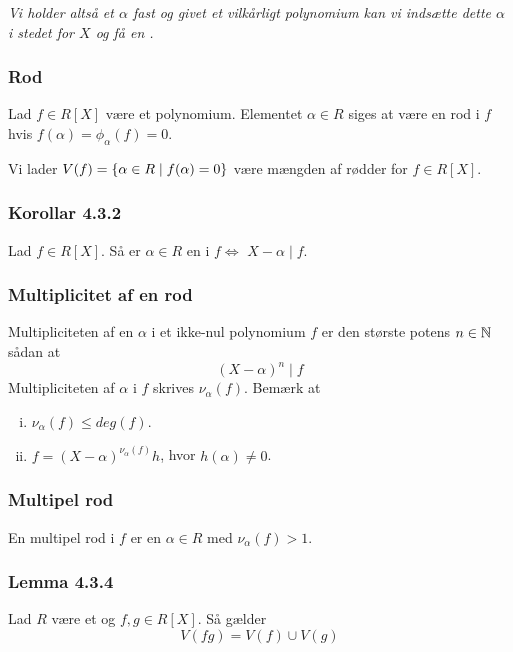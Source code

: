 \textit{Vi holder altså et $\alpha$ fast og givet et vilkårligt polynomium kan
vi indsætte dette $\alpha$ i stedet for $X$ og få en .}

\subsubsection{Rod}
\label{Rod}
Lad $f \in R[X]$ være et polynomium. Elementet $\alpha \in R$ siges at være en
rod i $f$ hvis $f(\alpha) = \phi_\alpha(f) = 0$.

Vi lader $V(f) = \{ \alpha \in R \mid f(\alpha) = 0 \}$ være mængden af rødder
for $f \in R[X]$.

\subsubsection{Korollar 4.3.2}
\label{Korollar 4.3.2}
Lad $f \in R[X]$. Så er $\alpha \in R$ en  i $f \iff$ $X - \alpha
\mid f$.

\subsubsection{Multiplicitet af en rod}
\label{Multiplicitet af en rod}
Multipliciteten af en  $\alpha$ i et ikke-nul polynomium $f$ er den
største potens $n \in \mathbb{N}$ sådan at
\begin{equation*}
  (X - \alpha)^n \mid f
\end{equation*}
Multipliciteten af $\alpha$ i $f$ skrives $\nu_\alpha (f)$. Bemærk at
\begin{enumerate}[(i)]
  \item $\nu_\alpha (f) \leq deg(f)$.
  \item $f = (X - \alpha)^{\nu_\alpha(f)}h$, hvor $h(\alpha) \neq 0$.
\end{enumerate}

\subsubsection{Multipel rod}
\label{Multipel rod}
En multipel rod i $f$ er en  $\alpha \in R$ med $\nu_\alpha(f) >
1$.

\subsubsection{Lemma 4.3.4}
\label{Lemma 4.3.4}
Lad $R$ være et  og $f,g \in R[X]$. Så gælder
\begin{equation*}
  V(fg) = V(f) \cup V(g)
\end{equation*}

